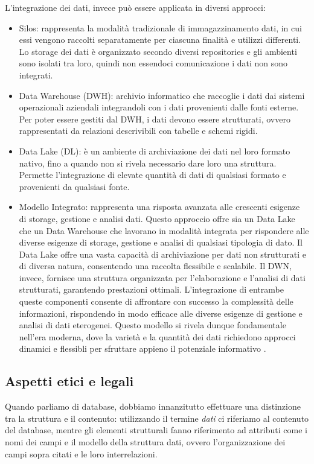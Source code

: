 L'integrazione dei dati, invece può essere applicata in diversi approcci:
\begin{itemize}
    \item Silos: rappresenta la modalità tradizionale di immagazzinamento dati, in cui essi vengono raccolti separatamente per ciascuna finalità e utilizzi differenti. Lo storage dei dati è organizzato secondo diversi repositories e gli ambienti sono isolati tra loro, quindi non essendoci comunicazione i dati non sono integrati.
    \item Data Warehouse (DWH): archivio informatico che raccoglie i dati dai sistemi operazionali aziendali integrandoli con i dati provenienti dalle fonti esterne. Per poter essere gestiti dal DWH, i dati devono essere strutturati, ovvero rappresentati da relazioni descrivibili con tabelle e schemi rigidi.
    \item Data Lake (DL): è un ambiente di archiviazione dei dati nel loro formato nativo, fino a quando non si rivela necessario dare loro una struttura. Permette l'integrazione di elevate quantità di dati di qualsiasi formato e provenienti da qualsiasi fonte.
    \item Modello Integrato: rappresenta una risposta avanzata alle crescenti esigenze di storage, gestione e analisi dati. Questo approccio offre sia un Data Lake che un Data Warehouse che lavorano in modalità integrata per rispondere alle diverse esigenze di storage, gestione e analisi di qualsiasi tipologia di dato. Il Data Lake offre una vasta capacità di archiviazione per dati non strutturati e di diversa natura, consentendo una raccolta flessibile e scalabile. Il DWN, invece, fornisce una struttura organizzata per l'elaborazione e l'analisi di dati strutturati, garantendo prestazioni ottimali. L'integrazione di entrambe queste componenti consente di affrontare con successo la complessità delle informazioni, rispondendo in modo efficace alle diverse esigenze di gestione e analisi di dati eterogenei. Questo modello si rivela dunque fondamentale nell'era moderna, dove la varietà e la quantità dei dati richiedono approcci dinamici e flessibli per sfruttare appieno il potenziale informativo \cite{Data_Integration}.
\end{itemize}


\subsection{Aspetti etici e legali}
Quando parliamo di database, dobbiamo innanzitutto effettuare una distinzione tra la struttura e il contenuto: utilizzando il termine \textit{dati} ci riferiamo al contenuto del database, mentre gli elementi strutturali fanno riferimento ad attributi come i nomi dei campi e il modello della struttura dati, ovvero l'organizzazione dei campi sopra citati e le loro interrelazioni.

